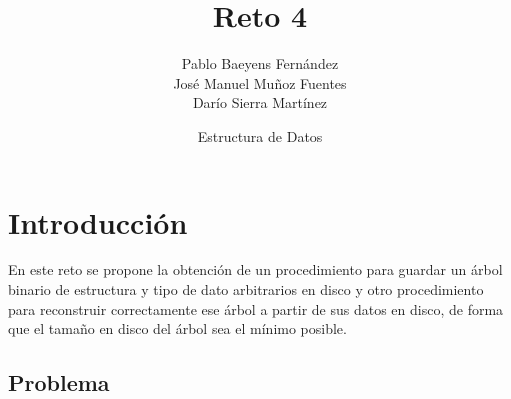 \documentclass{article}
\title{Reto 4}
\date{Estructura de Datos}
\author{Pablo Baeyens Fernández\\José Manuel Muñoz Fuentes\\Darío Sierra Martínez}
\begin{document}
\maketitle

\section{Introducción}

En este reto se propone la obtención de un procedimiento para guardar un árbol
binario de estructura y tipo de dato arbitrarios en disco y otro procedimiento
para reconstruir correctamente ese árbol a partir de sus datos en disco, de forma
que el tamaño en disco del árbol sea el mínimo posible. \\

\subsection{Problema}
\end{document}
